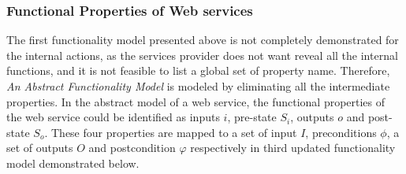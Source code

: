 \subsubsection{Functional Properties of Web services}\label{functional}


%

The first functionality model presented above is not completely demonstrated for the internal actions, as the services provider does not want reveal all the internal functions, and it is not feasible to list a global set of property name. Therefore, \emph{An Abstract Functionality Model} is modeled by eliminating all the intermediate properties. In the abstract model of a web service, the functional properties of the web service could be identified as inputs $i$, pre-state $S_i$, outputs $o$ and post-state $S_o$. These four properties are mapped to a set of input $I$, preconditions $\phi$, a set of outputs $O$ and postcondition $\varphi$ respectively in third updated functionality model demonstrated below.

